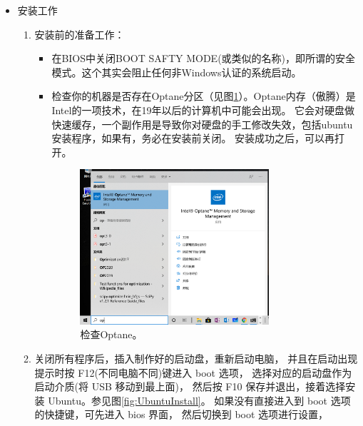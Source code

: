 \begin{itemize}
	\item 安装工作
	        \begin{enumerate}
                        \item 安装前的准备工作：
                                \begin{itemize}
                                        \item 在BIOS中关闭BOOT SAFTY MODE(或类似的名称)，即所谓的安全模式。这个其实会阻止任何非Windows认证的系统启动。 
                                        \item 检查你的机器是否存在Optane分区（见图\ref{fig:optane}）。Optane内存（傲腾）是Intel的一项技术，在19年以后的计算机中可能会出现。
                                          它会对硬盘做快速缓存，一个副作用是导致你对硬盘的手工修改失效，包括ubuntu安装程序，如果有，务必在安装前关闭。
                                          安装成功之后，可以再打开。
 				                  \begin{figure}[htbp]
					                  \centering
						          \includegraphics[width=0.75\textwidth]{png/optane}
                                                          \caption{检查Optane。}
                                                          \label{fig:optane}
				                  \end{figure}
                                \end{itemize}
			\item 关闭所有程序后，插入制作好的启动盘，重新启动电脑，
				并且在启动出现提示时按 F12(不同电脑不同)键进入 boot 选项，
				选择对应的启动盘作为启动介质(将 USB 移动到最上面)，
				然后按 F10 保存并退出，接着选择安装 Ubuntu。参见图\ref{fig:UbuntuInstall}。
				如果没有直接进入到 boot 选项的快捷键，可先进入 bios 界面，
				然后切换到 boot 选项进行设置，

\end{enumerate}
\end{itemize}
